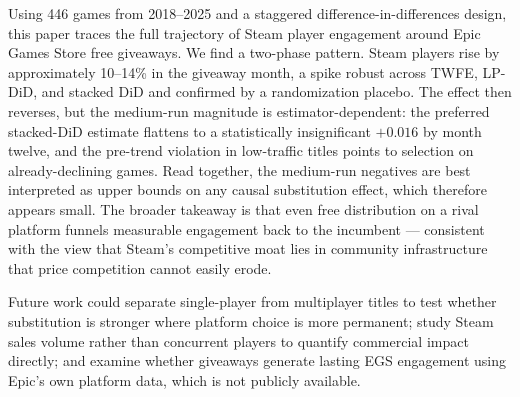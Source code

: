 \documentclass[11pt]{article}
\begin{document}
Using 446 games from 2018--2025 and a staggered difference-in-differences
design, this paper traces the full trajectory of Steam player engagement
around Epic Games Store free giveaways. We find a two-phase pattern. Steam
players rise by approximately 10--14\% in the giveaway month, a spike robust
across TWFE, LP-DiD, and stacked DiD and confirmed by a randomization placebo.
The effect then reverses, but the medium-run magnitude is estimator-dependent:
the preferred stacked-DiD estimate flattens to a statistically insignificant
$+0.016$ by month twelve, and the pre-trend violation in low-traffic titles
points to selection on already-declining games. Read together, the medium-run
negatives are best interpreted as upper bounds on any causal substitution
effect, which therefore appears small. The broader takeaway is that even free
distribution on a rival platform funnels measurable engagement back to the
incumbent --- consistent with the view that Steam's competitive moat lies in
community infrastructure that price competition cannot easily erode.

Future work could separate single-player from multiplayer titles to test
whether substitution is stronger where platform choice is more permanent;
study Steam sales volume rather than concurrent players to quantify
commercial impact directly; and examine whether giveaways generate lasting
EGS engagement using Epic's own platform data, which is not publicly
available.

\clearpage

\end{document}
